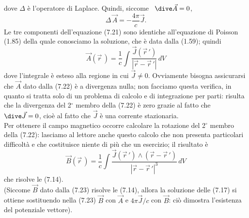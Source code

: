dove $\Delta$ \`e l'operatore di Laplace. Quindi, siccome \ $\dive\vec A=0$,
\begin{equation}
  \Delta\,\vec A=-\frac{4\pi}{c}\vec J.
  \tag{7.21}
\end{equation}
Le tre componenti dell'equazione (7.21) sono identiche all'equazione di Poisson
(1.85) della quale conosciamo la soluzione, che \`e data dalla (1.59); quindi
\begin{equation}
  \vec A(\vec r\,)
  =\frac{1}{c}\int\frac{\vec J(\vec r\,')}{|\vec r-\vec r\,'|}\,dV
  \tag{7.22}
\end{equation}
dove l'integrale \`e esteso alla regione in cui $\vec J\ne0$. Ovviamente bisogna
assicurarsi che $\vec A$ dato dalla (7.22) \`e a divergenza nulla; non facciamo
questa verifica, in quanto si tratta solo di un problema di calcolo e di
integrazione per parti: risulta che la divergenza del 2$^\circ$ membro della
(7.22) \`e zero grazie al fatto che \ $\dive\vec J=0$, cio\`e al fatto che
$\vec J$ \`e una corrente stazionaria.\\
Per ottenere il campo magnetico occorre calcolare la rotazione del 2$^\circ$
membro della (7.22): lasciamo al lettore anche questo calcolo che non presenta
particolari difficolt\`a e che costituisce niente di pi\`u che un esercizio; il
risultato \`e
\begin{equation}
  \vec B(\vec r\,)=\frac{1}{c}\int
  \frac{\vec J(\vec r\,')\wedge(\vec r-\vec r\,')}{|\vec r-\vec r\,'|^3}\,dV
  \tag{7.23}
\end{equation}
che risolve le (7.14).\\
(Siccome $\vec B$ dato dalla (7.23) risolve le (7.14), allora la soluzione delle
(7.17) si ottiene sostituendo nella (7.23) $\vec B$ con $\vec A$ e
$4\pi\vec J/c$ con $\vec B$: ci\`o dimostra l'esistenza del potenziale vettore).

